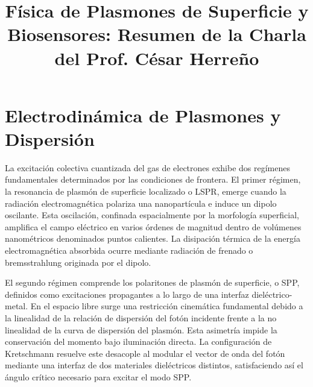 \documentclass[pdflatex,sn-mathphys-num]{sn-jnl}
\theoremstyle{thmstyleone}%
\theoremstyle{thmstyletwo}%
\theoremstyle{thmstylethree}%
\begin{document}
\title[Física de Plasmones]{Física de Plasmones de Superficie y Biosensores:
Resumen de la Charla del Prof. César Herreño}

\author{
}




\maketitle

\section{Electrodinámica de Plasmones y Dispersión}
\label{sec:plasmones}

La excitación colectiva cuantizada del gas de electrones exhibe dos regímenes
fundamentales determinados por las condiciones de frontera. El primer
régimen, la resonancia de plasmón de superficie localizado o LSPR, emerge
cuando la radiación electromagnética polariza una nanopartícula e induce un
dipolo oscilante. Esta oscilación, confinada espacialmente por la
morfología superficial, amplifica el campo eléctrico en varios órdenes de
magnitud dentro de volúmenes nanométricos denominados puntos calientes.
La disipación térmica de la energía electromagnética absorbida ocurre mediante
radiación de frenado o bremsstrahlung originada por el dipolo.

El segundo régimen comprende los polaritones de plasmón de superficie, o SPP,
definidos como excitaciones propagantes a lo largo de una interfaz
dieléctrico-metal. En el espacio libre surge una restricción
cinemática fundamental debido a la linealidad de la relación de dispersión del
fotón incidente frente a la no linealidad de la curva de dispersión del
plasmón. Esta asimetría impide la conservación del momento bajo iluminación
directa. La configuración de Kretschmann resuelve este desacople al
modular el vector de onda del fotón mediante una interfaz de dos materiales
dieléctricos distintos, satisfaciendo así el ángulo crítico necesario para
excitar el modo SPP.
\end{document}
